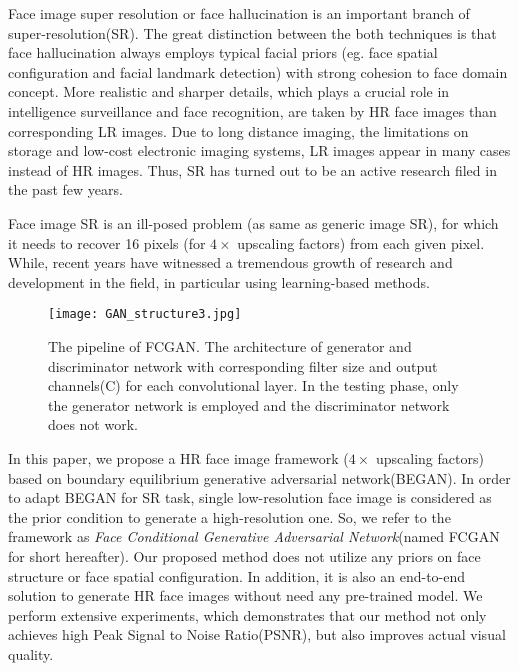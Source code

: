 \documentclass[conference,compsoc]{IEEEtran}
\begin{document}
Face image super resolution or face hallucination\citep{Jia2011Fast, zhu2016deep, wang2014comprehensive, li-PR2014face, autee2015review, Jiang2016Noise-TCYB, jin2015robust, su2016supervised, W2016DeepJFHR} is an important branch of super-resolution(SR). The great distinction between the both techniques is that face hallucination always employs typical facial priors (eg. face spatial configuration and facial landmark detection) with strong cohesion to face domain concept. More realistic and sharper details, which plays a crucial role in intelligence surveillance\cite{Jia2011Fast, wang2014comprehensive} and face recognition\cite{W2016DeepJFHR}, are taken by HR face images than corresponding LR images. Due to long distance imaging, the limitations on storage and low-cost electronic imaging systems, LR images appear in many cases instead of HR images. Thus, SR has turned out to be an active research filed in the past few years.

Face image SR is an ill-posed problem (as same as generic image SR), for which it needs to recover 16 pixels (for $4\times$ upscaling factors) from each given pixel. While, recent years have witnessed a tremendous growth of research and development in the field, in particular using learning-based methods.
\begin{figure}[h]
  \centering
  \texttt{[image: GAN\_structure3.jpg]}
  \caption{The pipeline of FCGAN. The architecture of generator and discriminator network with corresponding filter size and output channels(C) for each convolutional layer. In the testing phase, only the generator network is employed and the discriminator network does not work. }
  \label{Fig:architecture}
\end{figure}

In this paper, we propose a HR face image framework ($4\times$ upscaling factors) based on boundary equilibrium generative adversarial network(BEGAN)\cite{David-BEGAN2017}. In order to adapt BEGAN for SR task, single low-resolution face image is considered as the prior condition to generate a high-resolution one. So, we refer to the framework as \textit{Face Conditional Generative Adversarial Network}(named FCGAN for short hereafter). Our proposed method does not utilize any priors on face structure or face spatial configuration. In addition, it is also an end-to-end solution to generate HR face images without need any pre-trained model. We perform extensive experiments, which demonstrates that our method not only achieves high Peak Signal to Noise Ratio(PSNR), but also improves actual visual quality.
\end{document}
